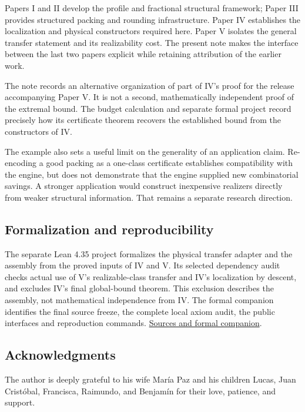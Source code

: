 \documentclass[english,11pt,a4paper]{article}
\begin{document}
Papers I and II develop the profile and fractional structural framework;
Paper III provides structured packing and rounding infrastructure. Paper
IV establishes the localization and physical constructors required here.
Paper V isolates the general transfer statement and its realizability
cost. The present note makes the interface between the last two papers
explicit while retaining attribution of the earlier work.

The note records an alternative organization of part of IV's proof for
the release accompanying Paper V. It is not a second, mathematically
independent proof of the extremal bound. The budget calculation and
separate formal project record precisely how its certificate theorem
recovers the established bound from the constructors of IV.

The example also sets a useful limit on the generality of an application
claim. Re-encoding a good packing as a one-class certificate establishes
compatibility with the engine, but does not demonstrate that the engine
supplied new combinatorial savings. A stronger application would
construct inexpensive realizers directly from weaker structural
information. That remains a separate research direction.

\subsection{Formalization and
reproducibility}\label{formalization-and-reproducibility}

The separate Lean 4.35 project formalizes the physical transfer adapter
and the assembly from the proved inputs of IV and V. Its selected
dependency audit checks actual use of V's realizable-class transfer and
IV's localization by descent, and excludes IV's final global-bound
theorem. This exclusion describes the assembly, not mathematical
independence from IV. The formal companion identifies the final source
freeze, the complete local axiom audit, the public interfaces and
reproduction commands.
\href{https://github.com/jtraverso/erdos-81-chordal-clique-partitions/tree/main/series_notes/NOTE_I_ERDOS81_TRANSFER/05_formalization}{Sources
and formal companion}.

\subsection{Acknowledgments}\label{acknowledgments}

The author is deeply grateful to his wife María Paz and his children
Lucas, Juan Cristóbal, Francisca, Raimundo, and Benjamín for their love,
patience, and support.
\end{document}
